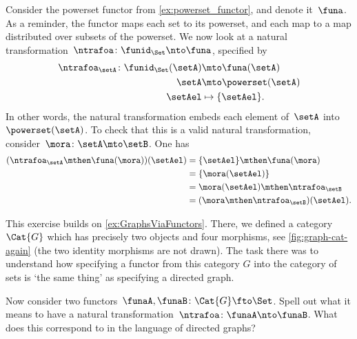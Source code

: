\begin{example}
    Consider the powerset functor from \cref{ex:powerset_functor}, and denote it~$\funa$.
    As a reminder, the functor maps each set to its powerset, and each map to a map distributed over subsets of the powerset.
    We now look at a natural transformation~$\ntrafoa\colon \funid_\Set \nto \funa$, specified by
    \begin{equation*}
        \begin{aligned}
            \ntrafoa_\setA\colon \funid_\Set(\setA) & \mto \funa(\setA)     \\
            \setA                                   & \mto \powerset(\setA) \\
            \setAel                                 & \mapsto \{\setAel\}.
        \end{aligned}
    \end{equation*}
    In other words, the natural transformation embeds each element of~$\setA$ into~$\powerset(\setA)$.
    To check that this is a valid natural transformation, consider~$\mora\colon \setA\mto \setB$.
    One has
    \begin{equation*}
        \begin{aligned}
            (\ntrafoa_\setA \mthen \funa(\mora))(\setAel)
             & =\{\setAel\} \mthen \funa(\mora)         \\
             & =\{\mora(\setAel)\}                      \\
             & =\mora(\setAel)\mthen \ntrafoa_\setB     \\
             & =(\mora \mthen \ntrafoa_\setB)(\setAel).
        \end{aligned}
    \end{equation*}
\end{example}

\begin{gradedexercise}
    \label{ex:NatTrafosGraphs}
    This exercise builds on \cref{ex:GraphsViaFunctors}.
    There, we defined a category~$\Cat{G}$ which has precisely two objects and four morphisms, see \cref{fig:graph-cat-again} (the two identity morphisms are not drawn).
    The task there was to understand how specifying a functor from this category $G$ into the category of sets is `the same thing' as specifying a directed graph.

    Now consider two functors~$\funaA, \funaB \colon \Cat{G} \fto \Set$.
    Spell out what it means to have a natural transformation~$\ntrafoa\colon \funaA \nto \funaB$.
    What does this correspond to in the language of directed graphs?
\end{gradedexercise}

